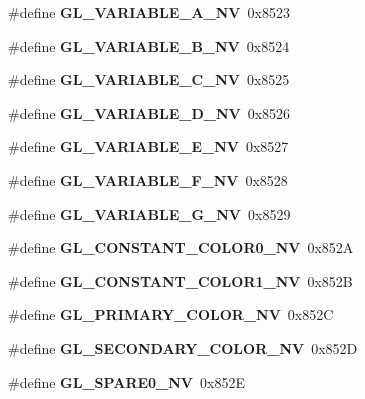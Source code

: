 \begin{DoxyCompactItemize}
\item 
\#define {\bfseries G\+L\+\_\+\+V\+A\+R\+I\+A\+B\+L\+E\+\_\+\+A\+\_\+\+N\+V}~0x8523\label{_s_d_l__opengl_8h_ae8c75a16d2f29930b3121b3f70d95c9b}

\item 
\#define {\bfseries G\+L\+\_\+\+V\+A\+R\+I\+A\+B\+L\+E\+\_\+\+B\+\_\+\+N\+V}~0x8524\label{_s_d_l__opengl_8h_a321d01491b1019d5d361322e2952a740}

\item 
\#define {\bfseries G\+L\+\_\+\+V\+A\+R\+I\+A\+B\+L\+E\+\_\+\+C\+\_\+\+N\+V}~0x8525\label{_s_d_l__opengl_8h_a6a30897c9b2c3ed36d990b5977d37bfc}

\item 
\#define {\bfseries G\+L\+\_\+\+V\+A\+R\+I\+A\+B\+L\+E\+\_\+\+D\+\_\+\+N\+V}~0x8526\label{_s_d_l__opengl_8h_a2d2ce31e463d010642e1311cbdec60c3}

\item 
\#define {\bfseries G\+L\+\_\+\+V\+A\+R\+I\+A\+B\+L\+E\+\_\+\+E\+\_\+\+N\+V}~0x8527\label{_s_d_l__opengl_8h_a7c5cc7793e6708a28828760af707bcea}

\item 
\#define {\bfseries G\+L\+\_\+\+V\+A\+R\+I\+A\+B\+L\+E\+\_\+\+F\+\_\+\+N\+V}~0x8528\label{_s_d_l__opengl_8h_ab8403e4070fbf878521bbd2fc4a3cf6e}

\item 
\#define {\bfseries G\+L\+\_\+\+V\+A\+R\+I\+A\+B\+L\+E\+\_\+\+G\+\_\+\+N\+V}~0x8529\label{_s_d_l__opengl_8h_a64eb49850f09015df3c02ab7fe2fbe0d}

\item 
\#define {\bfseries G\+L\+\_\+\+C\+O\+N\+S\+T\+A\+N\+T\+\_\+\+C\+O\+L\+O\+R0\+\_\+\+N\+V}~0x852\+A\label{_s_d_l__opengl_8h_a352100abbffda4fb8763f771adb664f9}

\item 
\#define {\bfseries G\+L\+\_\+\+C\+O\+N\+S\+T\+A\+N\+T\+\_\+\+C\+O\+L\+O\+R1\+\_\+\+N\+V}~0x852\+B\label{_s_d_l__opengl_8h_a659b1d6a4709678df49b74148425a820}

\item 
\#define {\bfseries G\+L\+\_\+\+P\+R\+I\+M\+A\+R\+Y\+\_\+\+C\+O\+L\+O\+R\+\_\+\+N\+V}~0x852\+C\label{_s_d_l__opengl_8h_a4c678d734016b53f2d57bf4466b45440}

\item 
\#define {\bfseries G\+L\+\_\+\+S\+E\+C\+O\+N\+D\+A\+R\+Y\+\_\+\+C\+O\+L\+O\+R\+\_\+\+N\+V}~0x852\+D\label{_s_d_l__opengl_8h_a1cdfbb05f432e472e337d5077ba42440}

\item 
\#define {\bfseries G\+L\+\_\+\+S\+P\+A\+R\+E0\+\_\+\+N\+V}~0x852\+E\label{_s_d_l__opengl_8h_a4dce054391cd554881fd7cbe7e5ea379}


\end{DoxyCompactItemize}

